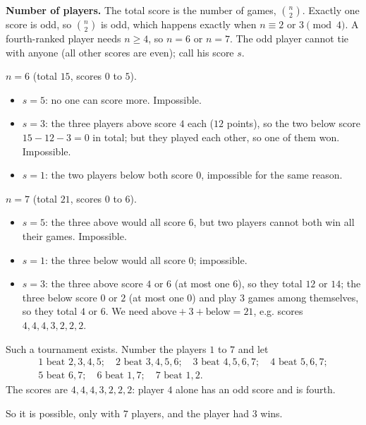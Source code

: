 \textbf{Number of players.} The total score is the number of games, $\binom{n}{2}$. Exactly one score is odd, so $\binom{n}{2}$ is odd, which happens exactly when $n\equiv2$ or $3\pmod4$. A fourth-ranked player needs $n\ge4$, so $n=6$ or $n=7$. The odd player cannot tie with anyone (all other scores are even); call his score $s$.

\textbf{$n=6$} (total $15$, scores $0$ to $5$).
\begin{itemize}
\item $s=5$: no one can score more. Impossible.
\item $s=3$: the three players above score $4$ each ($12$ points), so the two below score $15-12-3=0$ in total; but they played each other, so one of them won. Impossible.
\item $s=1$: the two players below both score $0$, impossible for the same reason.
\end{itemize}
\textbf{$n=7$} (total $21$, scores $0$ to $6$).
\begin{itemize}
\item $s=5$: the three above would all score $6$, but two players cannot both win all their games. Impossible.
\item $s=1$: the three below would all score $0$; impossible.
\item $s=3$: the three above score $4$ or $6$ (at most one $6$), so they total $12$ or $14$; the three below score $0$ or $2$ (at most one $0$) and play $3$ games among themselves, so they total $4$ or $6$. We need $\text{above}+3+\text{below}=21$, e.g. scores $4,4,4,3,2,2,2$.
\end{itemize}
Such a tournament exists. Number the players $1$ to $7$ and let
\[
\begin{array}{l}
1\text{ beat }2,3,4,5;\quad 2\text{ beat }3,4,5,6;\quad 3\text{ beat }4,5,6,7;\quad 4\text{ beat }5,6,7;\\
5\text{ beat }6,7;\quad 6\text{ beat }1,7;\quad 7\text{ beat }1,2 .
\end{array}
\]
The scores are $4,4,4,3,2,2,2$: player $4$ alone has an odd score and is fourth.

So it is possible, only with $7$ players, and the player had $\boxed{3}$ wins.
